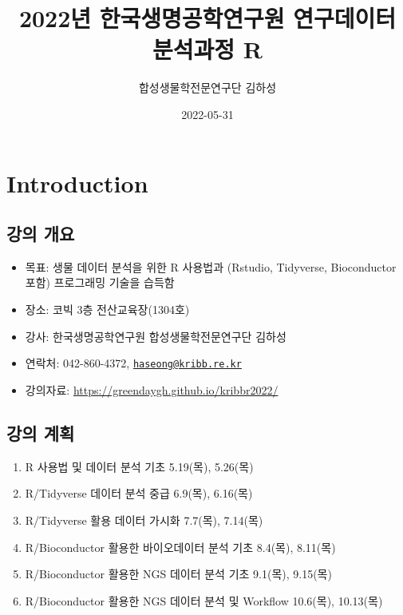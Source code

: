 \documentclass[
]{book}
\title{2022년 한국생명공학연구원 연구데이터 분석과정 R}
\author{합성생물학전문연구단 김하성}
\date{2022-05-31}
\providecommand{\tightlist}{%
  \setlength{\itemsep}{0pt}\setlength{\parskip}{0pt}}
\begin{document}
\maketitle

{
\setcounter{tocdepth}{1}
\tableofcontents
}
\hypertarget{introduction}{%
\chapter{Introduction}\label{introduction}}

\hypertarget{Information}{%
\section{강의 개요}\label{Information}}

\begin{itemize}
\tightlist
\item
  목표: 생물 데이터 분석을 위한 R 사용법과 (Rstudio, Tidyverse, Bioconductor 포함) 프로그래밍 기술을 습득함
\item
  장소: 코빅 3층 전산교육장(1304호)
\item
  강사: 한국생명공학연구원 합성생물학전문연구단 김하성
\item
  연락처: 042-860-4372, \href{mailto:haseong@kribb.re.kr}{\nolinkurl{haseong@kribb.re.kr}}
\item
  강의자료: \url{https://greendaygh.github.io/kribbr2022/}
\end{itemize}

\hypertarget{Schedule}{%
\section{강의 계획}\label{Schedule}}

\begin{enumerate}
\def\labelenumi{\arabic{enumi}.}
\tightlist
\item
  R 사용법 및 데이터 분석 기초 5.19(목), 5.26(목)
\item
  R/Tidyverse 데이터 분석 중급 6.9(목), 6.16(목)
\item
  R/Tidyverse 활용 데이터 가시화 7.7(목), 7.14(목)
\item
  R/Bioconductor 활용한 바이오데이터 분석 기초 8.4(목), 8.11(목)
\item
  R/Bioconductor 활용한 NGS 데이터 분석 기초 9.1(목), 9.15(목)
\item
  R/Bioconductor 활용한 NGS 데이터 분석 및 Workflow 10.6(목), 10.13(목)
\end{enumerate}
\end{document}
